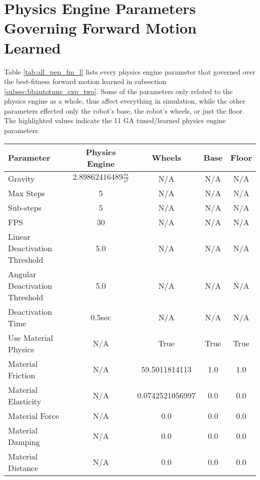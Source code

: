 
\chapter{Physics Engine Parameters Governing Forward Motion Learned}

\label{AppendixA}

Table \ref{tab:all_pep_fm_l} lists every physics engine parameter that governed over the best-fitness forward motion learned in subsection \ref{subsec:bbautotune_exp_two}. Some of the parameters only related to the physics engine as a whole, thus affect everything in simulation, while the other parameters effected only the robot's base, the robot's wheels, or just the floor. The highlighted values indicate the 11 GA tuned/learned physics engine parameters.

\begin{table}[htbp]
\centering
\footnotesize
\def\arraystretch{1.1}
\begin{tabular}{ | l || c | c | c | c | }
\hline
\rowcolor{lightgray}
Parameter & Physics Engine     & Wheels & Base & Floor     \\ \hline
Gravity   & \cellcolor{lightblue} $2.89862416489\frac{m}{s^2}$ & N/A    & N/A  & N/A       \\ \hline
Max Steps & 5  & N/A & N/A & N/A \\ \hline
Sub-steps & \cellcolor{lightblue} 5  & N/A & N/A & N/A \\ \hline
FPS       & \cellcolor{lightblue} 30 & N/A & N/A & N/A \\ \hline
Linear Deactivation Threshold  & 5.0    & N/A & N/A & N/A \\ \hline
Angular Deactivation Threshold & 5.0    & N/A & N/A & N/A \\ \hline
Deactivation Time              & 0.5sec & N/A & N/A & N/A \\ \hline \hline
Use Material Physics       & N/A & True            & True & True \\ \hline
Material Friction          & N/A & \cellcolor{lightblue} 59.5011814113   & 1.0  & 1.0 \\ \hline
Material Elasticity        & N/A & \cellcolor{lightblue} 0.0742521056997 & 0.0  & 0.0 \\ \hline
Material Force             & N/A & 0.0                              & 0.0  & 0.0 \\ \hline
Material Damping           & N/A & 0.0                              & 0.0  & 0.0 \\ \hline
Material Distance          & N/A & 0.0                              & 0.0  & 0.0 \\ \hline

\end{tabular}
\end{table}
